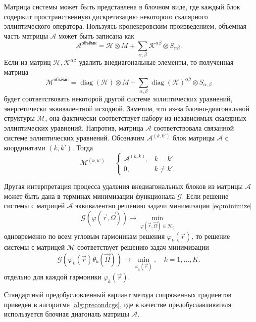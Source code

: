 Матрица системы может быть представлена в блочном виде, где каждый блок содержит пространственную дискретизацию некоторого скалярного эллиптического оператора. Пользуясь кронекеровским произведением, объемная часть матрицы $\mathcal{A}$ может быть записана как
\[
\mathcal{A}^\text{объёмн} = \mathscr{H} \otimes M + \sum_{\alpha,\beta} \mathscr{K}^{\alpha\beta} \otimes S_{\alpha\beta}.
\]
Если из матриц $\mathscr{H}, \mathscr{K}^{\alpha\beta}$ удалить внедиагональные элементы, то полученная матрица
\begin{equation}
\mathcal{M}^\text{объёмн} = \operatorname{diag}(\mathscr{H}) \otimes M + \sum_{\alpha,\beta}  \operatorname{diag}(\mathscr{K})^{\alpha\beta} \otimes S_{\alpha,\beta}
\label{eq:precondop}
\end{equation}
будет соответствовать некоторой другой системе эллиптических уравнений, энергетически эквивалентной исходной. Заметим, что из-за блочно-диагональной структуры $\mathcal{M}$, она фактически соответствует набору из независимых скалярных эллиптических уравнений. Напротив, матрица $\mathcal{A}$ соответствовала связанной системе эллиптических уравнений.
Обозначим $\mathcal{A}^{(k,k')}$ блок матрицы $\mathcal{A}$ с координатами $(k, k')$. Тогда
\[
\mathcal{M}^{(k,k')} = \begin{cases}
\mathcal{A}^{(k,k)}, & k = k'\\
0, &k \neq k'.
\end{cases}
\]

Другая интерпретация процесса удаления внедиагональных блоков из матрицы $\mathcal{A}$ может быть дана в терминах минимизации функционала $\mathcal{G}$. Если решение системы с матрицей $\mathcal{A}$ эквивалентно решению задачи минимизации \eqref{eq:minimize}
\[
\mathcal{G}(\varphi(\vec r, \vec \Omega)) \to \min_{\varphi(\vec r, \vec \Omega) \in \mathcal{H}_0}
\]
одновременно по всем угловым гармоникам решения $\varphi_k(\vec r)$, то решение системы с матрицей $\mathcal{M}$ соответствует решению задач минимизации
\[
\mathcal{G}(\varphi_{k}(\vec r) \theta_k(\vec \Omega)) \to \min_{\varphi_k(\vec r)}, \quad k = 1, \dots, K.
\]
отдельно для каждой гармоники $\varphi_k(\vec r)$. 

Стандартный предобусловленный вариант метода сопряженных градиентов приведен в алгоритме \ref{alg:precondcgs}, где в качестве предобуславливателя используется блочная диагональ матрицы $\mathcal {A}$.

